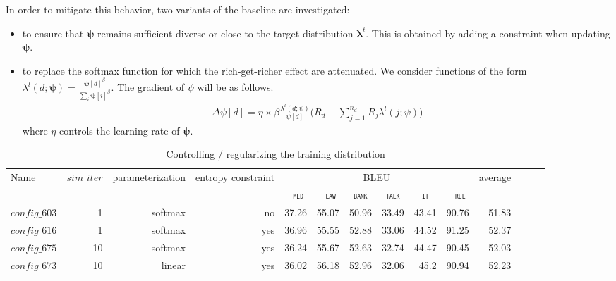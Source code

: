 \documentclass[11pt,a4paper]{article}
\newcommand{\domain}[1]{\texttt{\textsc{#1}}}
\newcommand{\system}[1]{\texttt{{#1}}}
\newcommand{\vlambda}{\ensuremath{\boldsymbol\lambda}\xspace} %
\newcommand{\vpsi}{\ensuremath{\boldsymbol\psi}\xspace} %
\begin{document}
In order to mitigate this behavior, two variants of the baseline are investigated:
\begin{itemize}
\item to ensure that $\vpsi$ remains sufficient diverse or close to the target distribution $\vlambda^t$. This is obtained by adding a constraint when updating $\vpsi$. 
\item to replace the softmax function for which the rich-get-richer effect are attenuated. We consider functions of the form $\lambda
^l(d;\vpsi) = \frac{\vpsi[d]^\beta}{\sum_i \vpsi[i]^\beta}$. The gradient of $\psi$ will be as follows.
\begin{align*}
\Delta\psi[d] = \eta \times \beta \frac{\lambda^l(d;\psi)}{\psi[d]} \big( R_d - \displaystyle{\mathop{\sum}_{j=1}^{n_d}} R_j \lambda^l(j;\psi) \big)
\end{align*}
where $\eta$ controls the learning rate of $\vpsi$.
\end{itemize}

\begin{table}
  \centering %
  \begin{adjustbox}{width=1.0\textwidth,center}
  \begin{tabular}{|p{2.0cm}|*{13}{r|}} \hline
    \multirow{2}{*}{Name} & \multirow{2}{*}{$sim\_iter$} & \multirow{2}{*}{parameterization} & \multirow{2}{*}{entropy constraint} & \multicolumn{6}{|c|}{BLEU} & \multirow{2}{*}{average} \\ \cline{5-10}	
   & & & & \multicolumn{1}{c|}{\domain{ med}} & \multicolumn{1}{c|}{\domain{ law}} & \multicolumn{1}{c|}{\domain{bank}} & \multicolumn{1}{c|}{\domain{talk}} & \multicolumn{1}{c|}{\domain{ it }} & \multicolumn{1}{c|}{\domain{ rel}} &  \\
    \hline
    \system{$config\_603$} & 1 & softmax & no & 37.26& 55.07& 50.96& 33.49& 43.41& 90.76& 51.83\\
    \system{$config\_616$} & 1 & softmax & yes & 36.96& 55.55& 52.88& 33.06& 44.52& 91.25& 52.37 \\
    \system{$config\_675$} & 10 & softmax & yes & 36.24& 55.67& 52.63& 32.74& 44.47& 90.45& 52.03\\
    \system{$config\_673$} & 10 & linear & yes & 36.02& 56.18& 52.96& 32.06& 45.2 & 90.94 & 52.23 \\
  \hline
  \end{tabular}
  \end{adjustbox}
  \caption{Controlling / regularizing the training distribution}
  \label{tab:performance}
\end{table}
\end{document}
